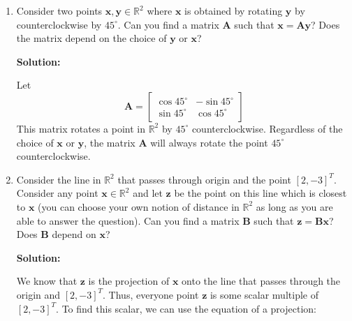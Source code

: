 \begin{enumerate}[label=(\alph*)]
	\item Consider two points $\mathbf{x,y} \in \mathbb{R}^2$ where $\mathbf{x}$ is
	      obtained by rotating $\mathbf{y}$ by counterclockwise by $45^{\circ}$.
	      Can you find a matrix $\mathbf{A}$ such that $\mathbf{x} = \mathbf{A}
		      \mathbf{y}$? Does the matrix depend on the choice of $\mathbf{y}$
	      or $\mathbf{x}$?
	      \begin{tcolorbox}
		      \textbf{Solution:} \par
		      Let
		      $$
			      \mathbf{A} = \begin{bmatrix}
				      \cos 45^{\circ} & -\sin 45^{\circ} \\
				      \sin 45^{\circ} & \cos 45^{\circ}\end{bmatrix}
		      $$
		      This matrix rotates a point in $\mathbb{R}^2$ by $45^{\circ}$
		      counterclockwise. Regardless of the choice of $\mathbf{x}$
		      or $\mathbf{y}$, the matrix $\mathbf{A}$ will always rotate
		      the point $45^{\circ}$ counterclockwise.	      \end{tcolorbox}
	\item Consider the line in $\mathbb{R}^2$ that passes through origin and the
	      point $\left[ 2, -3 \right]^T$. Consider any point $\mathbf{x} \in
		      \mathbb{R}^2$ and let $\mathbf{z}$ be the point on this line which is
	      closest to $\mathbf{x}$ (you can choose your own notion of distance in
	      $\mathbb{R}^2$ as long as you are able to answer the question). Can you
	      find a matrix $\mathbf{B}$ such that $\mathbf{z} = \mathbf{Bx}$? Does
	      $\mathbf{B}$ depend on $\mathbf{x}$?
	      \begin{tcolorbox}
		      \textbf{Solution:} \par
		      We know that $\mathbf{z}$ is the projection of $\mathbf{x}$ onto the line
		      that passes through the origin and $\left[ 2, -3 \right]^T$. Thus,
		      everyone point $\mathbf{z}$ is some scalar multiple of $\left[ 2, -3
				      \right]^T$. To find this scalar, we can use the
		      equation of a projection:


\end{tcolorbox}
\end{enumerate}

